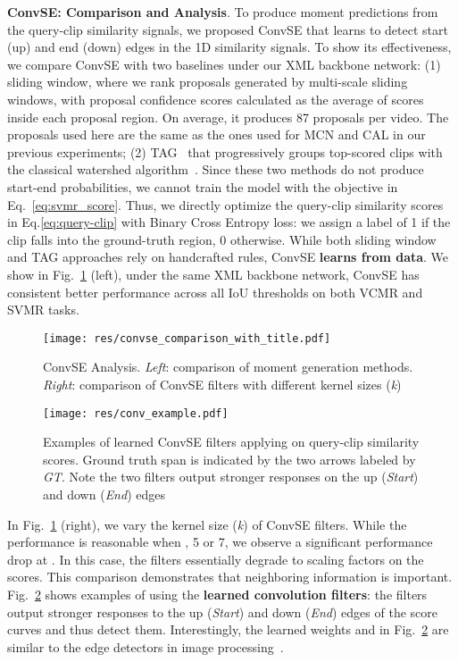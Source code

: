 \documentclass[runningheads]{llncs}
\begin{document}
\kern1mm
\noindent\textbf{ConvSE: Comparison and Analysis}. 
To produce moment predictions from the query-clip similarity signals, we proposed ConvSE that learns to detect start (up) and end (down) edges in the 1D similarity signals. 
To show its effectiveness, we compare ConvSE with two baselines under our XML backbone network: (1) sliding window, where we rank proposals generated by multi-scale sliding windows, with proposal confidence scores calculated as the average of scores inside each proposal region. On average, it produces 87 proposals per video. The proposals used here are the same as the ones used for MCN and CAL in our previous experiments; (2) TAG~\cite{zhao2017temporal} that progressively groups top-scored clips with the classical watershed algorithm~\cite{roerdink2000watershed}. 
Since these two methods do not produce start-end probabilities, we cannot train the model with the objective in Eq.~\ref{eq:svmr_score}. 
Thus, we directly optimize the query-clip similarity scores in Eq.\ref{eq:query-clip} with Binary Cross Entropy loss: we assign a label of 1 if the clip falls into the ground-truth region, 0 otherwise.
While both sliding window and TAG approaches rely on handcrafted rules, ConvSE \textbf{learns from data}. 
We show in Fig.~\ref{fig:convse_comparison} (left), under the same XML backbone network, ConvSE has consistent better performance across all IoU thresholds on both VCMR and SVMR tasks. 


\begin{figure}[!t]
  \centering
  \texttt{[image: res/convse\_comparison\_with\_title.pdf]}
  \caption{ConvSE Analysis. \textit{Left}: comparison of moment generation methods. \textit{Right}: comparison of ConvSE filters with different kernel sizes (\textit{k})}
  \label{fig:convse_comparison}
\end{figure}



\begin{figure}[!t]
  \centering
  \texttt{[image: res/conv\_example.pdf]}
  \caption{Examples of learned ConvSE filters applying on query-clip similarity scores. Ground truth span is indicated by the two arrows  labeled by \textit{GT}. Note the two filters output stronger responses on the up (\textit{Start}) and down (\textit{End}) edges}
  \label{fig:conv_example}
\end{figure}


In Fig.~\ref{fig:convse_comparison} (right), we vary the kernel size (\textit{k}) of ConvSE filters. While the performance is reasonable when , 5 or 7, we observe a significant performance drop at . 
In this case, the filters essentially degrade to scaling factors on the scores.
This comparison demonstrates that neighboring information is important.
Fig.~\ref{fig:conv_example} shows examples of using the \textbf{learned convolution filters}: the filters output stronger responses to the up (\textit{Start}) and down (\textit{End}) edges of the score curves and thus detect them.
Interestingly, the learned weights  and  in Fig.~\ref{fig:conv_example} are similar to the edge detectors in image processing~\cite{szeliski2010computer}.
\end{document}

